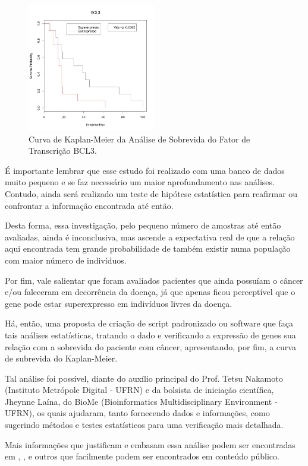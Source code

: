 \documentclass[a4paper,12pt]{article}
\begin{document}
\begin{figure}[h!]
\centering
\includegraphics[width=0.5\textwidth]{Kaplan-Meier_GeneBCL3.jpeg}
\caption{Curva de Kaplan-Meier da Análise de Sobrevida do Fator de Transcrição BCL3.}
\label{fig:TesteNorm}
\end{figure}

É importante lembrar que esse estudo foi realizado com uma banco de dados muito pequeno e se faz necessário um maior aprofundamento nas análises. Contudo, ainda será realizado um teste de hipótese estatística para reafirmar ou confrontar a informação encontrada até então.

Desta forma, essa investigação, pelo pequeno número de amostras até então avaliadas, ainda é inconclusiva, mas ascende a expectativa real de que a relação aqui encontrada tem grande probabilidade de também existir numa população com maior número de indivíduos. 

Por fim, vale salientar que foram avaliados pacientes que ainda possuíam o câncer e/ou faleceram em decorrência da doença, já que apenas ficou perceptível que o gene pode estar superexpresso em indivíduos livres da doença.

Há, então, uma proposta de criação de script padronizado ou software que faça tais análises estatísticas, tratando o dado e verificando a expressão de genes sua relação com a sobrevida do paciente com câncer, apresentando, por fim, a curva de subrevida do Kaplan-Meier.

Tal análise foi possível, diante do auxílio principal do Prof. Tetsu Nakamoto (Instituto Metrópole Digital - UFRN) e da bolsista de iniciação científica, Jheynne Laína, do BioMe (Bioinformatics Multidisciplinary Environment - UFRN), os quais ajudaram, tanto fornecendo dados e informações, como sugerindo métodos e testes estatísticos para uma verificação mais detalhada.  

Mais informações que justificam e embasam essa análise podem ser encontradas em \cite{brahmer2012safety}, \cite{reck2016pembrolizumab}, \cite{iwai2002involvement} e outros que facilmente podem ser encontrados em conteúdo público.



\end{document}
